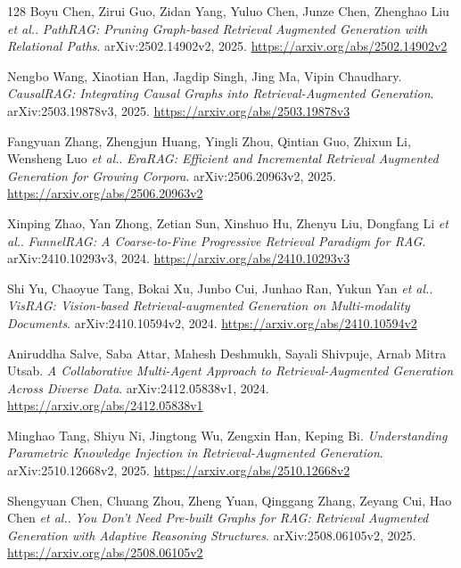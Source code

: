 \documentclass[11pt,a4paper]{article}
\begin{document}
\begin{thebibliography}{128}
Boyu Chen, Zirui Guo, Zidan Yang, Yuluo Chen, Junze Chen, Zhenghao Liu \emph{et al.}.
\newblock \emph{PathRAG: Pruning Graph-based Retrieval Augmented Generation with Relational Paths}.
\newblock arXiv:2502.14902v2, 2025.
\newblock \url{https://arxiv.org/abs/2502.14902v2}

Nengbo Wang, Xiaotian Han, Jagdip Singh, Jing Ma, Vipin Chaudhary.
\newblock \emph{CausalRAG: Integrating Causal Graphs into Retrieval-Augmented Generation}.
\newblock arXiv:2503.19878v3, 2025.
\newblock \url{https://arxiv.org/abs/2503.19878v3}

Fangyuan Zhang, Zhengjun Huang, Yingli Zhou, Qintian Guo, Zhixun Li, Wensheng Luo \emph{et al.}.
\newblock \emph{EraRAG: Efficient and Incremental Retrieval Augmented Generation for Growing Corpora}.
\newblock arXiv:2506.20963v2, 2025.
\newblock \url{https://arxiv.org/abs/2506.20963v2}

Xinping Zhao, Yan Zhong, Zetian Sun, Xinshuo Hu, Zhenyu Liu, Dongfang Li \emph{et al.}.
\newblock \emph{FunnelRAG: A Coarse-to-Fine Progressive Retrieval Paradigm for RAG}.
\newblock arXiv:2410.10293v3, 2024.
\newblock \url{https://arxiv.org/abs/2410.10293v3}

Shi Yu, Chaoyue Tang, Bokai Xu, Junbo Cui, Junhao Ran, Yukun Yan \emph{et al.}.
\newblock \emph{VisRAG: Vision-based Retrieval-augmented Generation on Multi-modality Documents}.
\newblock arXiv:2410.10594v2, 2024.
\newblock \url{https://arxiv.org/abs/2410.10594v2}

Aniruddha Salve, Saba Attar, Mahesh Deshmukh, Sayali Shivpuje, Arnab Mitra Utsab.
\newblock \emph{A Collaborative Multi-Agent Approach to Retrieval-Augmented Generation Across Diverse Data}.
\newblock arXiv:2412.05838v1, 2024.
\newblock \url{https://arxiv.org/abs/2412.05838v1}

Minghao Tang, Shiyu Ni, Jingtong Wu, Zengxin Han, Keping Bi.
\newblock \emph{Understanding Parametric Knowledge Injection in Retrieval-Augmented Generation}.
\newblock arXiv:2510.12668v2, 2025.
\newblock \url{https://arxiv.org/abs/2510.12668v2}

Shengyuan Chen, Chuang Zhou, Zheng Yuan, Qinggang Zhang, Zeyang Cui, Hao Chen \emph{et al.}.
\newblock \emph{You Don't Need Pre-built Graphs for RAG: Retrieval Augmented Generation with Adaptive Reasoning Structures}.
\newblock arXiv:2508.06105v2, 2025.
\newblock \url{https://arxiv.org/abs/2508.06105v2}


\end{thebibliography}
\end{document}
